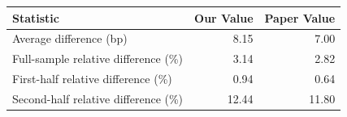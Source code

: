 \begin{tabular}{lrr}
\toprule
Statistic & Our Value & Paper Value \\
\midrule
Average difference (bp) & 8.15 & 7.00 \\
Full-sample relative difference (\%) & 3.14 & 2.82 \\
First-half relative difference (\%) & 0.94 & 0.64 \\
Second-half relative difference (\%) & 12.44 & 11.80 \\
\bottomrule
\end{tabular}
